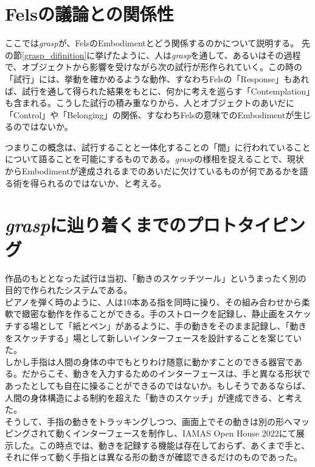\section{Felsの議論との関係性}
ここでは\textit{grasp}が、FelsのEmbodimentとどう関係するのかについて説明する。
先の節\ref{grasp_difinition}に挙げたように、人は\textit{grasp}を通して、あるいはその過程で、オブジェクトから影響を受けながら次の試行が形作られていく。この時の「試行」には、挙動を確かめるような動作、すなわちFelsの「Response」もあれば、試行を通して得られた結果をもとに、何かに考えを巡らす「Contemplation」も含まれる。こうした試行の積み重なりから、人とオブジェクトのあいだに「Control」や「Belonging」の関係、すなわちFelsの意味でのEmbodimentが生じるのではないか。

つまりこの概念は、試行することと一体化することの「間」に行われていることについて語ることを可能にするものである。\textit{grasp}の様相を捉えることで、現状からEmbodimentが達成されるまでのあいだに欠けているものが何であるかを語る術を得られるのではないか、と考える。

\section{\textit{grasp}に辿り着くまでのプロトタイピング}
\label{prototyping_concept_making}
作品のもととなった試行は当初、「動きのスケッチツール」というまったく別の目的で作られたシステムである。\\
ピアノを弾く時のように、人は10本ある指を同時に操り、その組み合わせから柔軟で緻密な動作を作ることができる。手のストロークを記録し、静止画をスケッチする場として「紙とペン」があるように、手の動きをそのまま記録し、「動きをスケッチする」場として新しいインターフェースを設計することを案じていた。\\
しかし手指は人間の身体の中でもとりわけ随意に動かすことのできる器官である。だからこそ、動きを入力するためのインターフェースは、手と異なる形状であったとしても自在に操ることができるのではないか。もしそうであるならば、人間の身体構造による制約を超えた「動きのスケッチ」が達成できる、と考えた。\\
そうして、手指の動きをトラッキングしつつ、画面上でその動きは別の形へマッピングされて動くインターフェースを制作し、IAMAS Open House 2022にて展示した。この時点では、動きを記録する機能は存在しておらず、あくまで手と、それに伴って動く手指とは異なる形の動きが確認できるだけのものであった。\\

